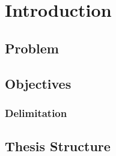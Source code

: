 \chapter{Introduction}
\label{chap:intro}

\lipsum[3]


\section{Problem}

\lipsum[1-3]


\section{Objectives}

\lipsum[1-2]


\subsection{Delimitation}

\lipsum[1]


\section{Thesis Structure}

\lipsum[1-3]

